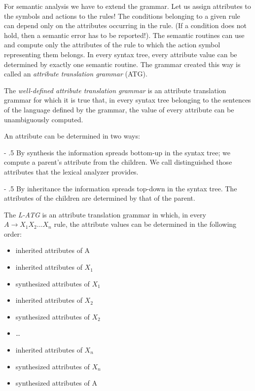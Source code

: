 \documentclass[margin=0px]{article}
\makeatletter
\renewcommand\paragraph{%
    \@startsection{paragraph}{4}{0mm}%
    {-\baselineskip}%
    {.5\baselineskip}%
    {\normalfont\normalsize\bfseries}}
\makeatother
\begin{document}
For semantic analysis we have to extend the grammar. Let us assign attributes to the symbols and actions to the rules! The conditions belonging to a given rule can depend only on the attributes	occurring in the rule.	(If a condition does not hold, then a semantic error has to be	reported!). The semantic routines can use and compute only the	attributes of the rule to which the action symbol representing them belongs. In every syntax tree, every attribute value can be determined by exactly one
semantic routine. The grammar created this way is called an \textit{attribute translation grammar} (ATG).

The \textit{well-defined attribute translation grammar} is an attribute translation grammar for which it is true that, in every syntax tree belonging to the sentences of the language defined by the	grammar, the value of every attribute can be unambiguously computed.

An attribute can be determined in two ways:

\paragraph{By synthesis} the information spreads bottom-up in the syntax tree; we compute a parent's attribute from the children. We call distinguished those attributes that the lexical analyzer provides.

\paragraph{By inheritance} the information spreads top-down in the syntax tree. The attributes of the children are determined by that of the parent.

The \textit{L-ATG} is an attribute translation grammar in which, in every
$ A	\rightarrow	X_1X_2 . . .	X_n  $ rule, the attribute values can be determined in the following order:

\begin{itemize}
    \item
          inherited attributes of A
    \item
          inherited attributes of $ X_1 $
    \item
          synthesized attributes of $ X_1 $
    \item
          inherited attributes of $ X_2 $
    \item
          synthesized attributes of $ X_2 $
    \item
          \dots
    \item
          inherited attributes of $ X_n $
    \item
          synthesized attributes of $ X_n $
    \item
          synthesized attributes of A
\end{itemize}
\end{document}
